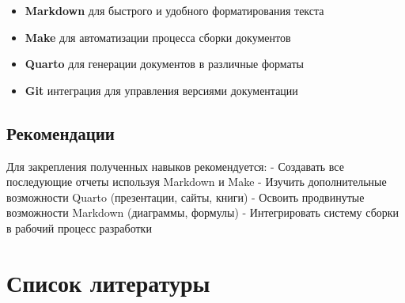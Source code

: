\documentclass[
  12pt,
  a4paper,
  DIV=11,
  numbers=noendperiod]{scrreprt}
\providecommand{\tightlist}{%
  \setlength{\itemsep}{0pt}\setlength{\parskip}{0pt}}\usepackage{longtable,booktabs,array}
\begin{document}
\begin{itemize}
\tightlist
\item
  \textbf{Markdown} для быстрого и удобного форматирования текста
\item
  \textbf{Make} для автоматизации процесса сборки документов
\item
  \textbf{Quarto} для генерации документов в различные форматы
\item
  \textbf{Git} интеграция для управления версиями документации
\end{itemize}

\section{Рекомендации}\label{ux440ux435ux43aux43eux43cux435ux43dux434ux430ux446ux438ux438}

Для закрепления полученных навыков рекомендуется: - Создавать все
последующие отчеты используя Markdown и Make - Изучить дополнительные
возможности Quarto (презентации, сайты, книги) - Освоить продвинутые
возможности Markdown (диаграммы, формулы) - Интегрировать систему сборки
в рабочий процесс разработки

\chapter*{Список
литературы}\label{ux441ux43fux438ux441ux43eux43a-ux43bux438ux442ux435ux440ux430ux442ux443ux440ux44b}

\printbibliography[heading=none]
\end{document}
